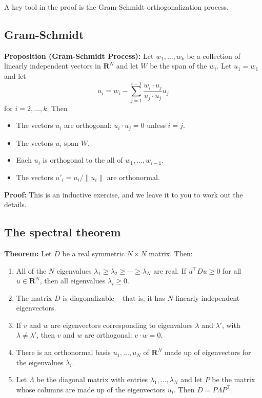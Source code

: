 \documentclass[
  11pt,
  letterpaper,
]{scrbook}
\providecommand{\tightlist}{%
  \setlength{\itemsep}{0pt}\setlength{\parskip}{0pt}}\usepackage{longtable,booktabs,array}
\theoremstyle{plain}
\theoremstyle{plain}
\theoremstyle{remark}
\begin{document}
A key tool in the proof is the Gram-Schmidt orthogonalization process.

\hypertarget{sec-gsprocess}{%
\subsection{Gram-Schmidt}\label{sec-gsprocess}}

\textbf{Proposition (Gram-Schmidt Process):} Let \(w_{1},\ldots, w_{k}\)
be a collection of linearly independent vectors in \(\mathbf{R}^{N}\)
and let \(W\) be the span of the \(w_{i}\). Let \(u_{1} = w_{1}\) and
let \[
u_{i} = w_{i} - \sum_{j=1}^{i-1} \frac{w_{i}\cdot u_{j}}{u_{j}\cdot u_{j}}u_{j}
\] for \(i=2,\ldots, k\). Then

\begin{itemize}
\tightlist
\item
  The vectors \(u_{i}\) are orthogonal: \(u_{i}\cdot u_{j}=0\) unless
  \(i=j\).
\item
  The vectors \(u_{i}\) span \(W\).
\item
  Each \(u_{i}\) is orthogonal to the all of \(w_{1},\ldots, w_{i-1}\).
\item
  The vectors \(u'_{i} = u_{i}/\|u_{i}\|\) are orthonormal.
\end{itemize}

\textbf{Proof:} This is an inductive exercise, and we leave it to you to
work out the details.

\hypertarget{the-spectral-theorem}{%
\subsection{The spectral theorem}\label{the-spectral-theorem}}

\textbf{Theorem:} Let \(D\) be a real symmetric \(N\times N\) matrix.
Then:

\begin{enumerate}
\def\labelenumi{\arabic{enumi}.}
\tightlist
\item
  All of the \(N\) eigenvalues
  \(\lambda_1\ge \lambda_2\ge \cdots \ge \lambda_{N}\) are real. If
  \(u^{\intercal}Du\ge 0\) for all \(u\in\mathbf{R}^{N}\), then all
  eigenvalues \(\lambda_{i}\ge 0\).
\item
  The matrix \(D\) is diagonalizable -- that is, it has \(N\) linearly
  independent eigenvectors.
\item
  If \(v\) and \(w\) are eigenvectors corresponding to eigenvalues
  \(\lambda\) and \(\lambda'\), with \(\lambda\not=\lambda'\), then
  \(v\) and \(w\) are orthogonal: \(v\cdot w=0\).
\item
  There is an orthonormal basis \(u_{1},\ldots, u_{N}\) of
  \(\mathbf{R}^{N}\) made up of eigenvectors for the eigenvalues
  \(\lambda_{i}\).
\item
  Let \(\Lambda\) be the diagonal matrix with entries
  \(\lambda_{1},\ldots, \lambda_{N}\) and let \(P\) be the matrix whose
  columns are made up of the eigenvectors \(u_{i}\). Then
  \(D=P\Lambda P^{\intercal}\).
\end{enumerate}
\end{document}
